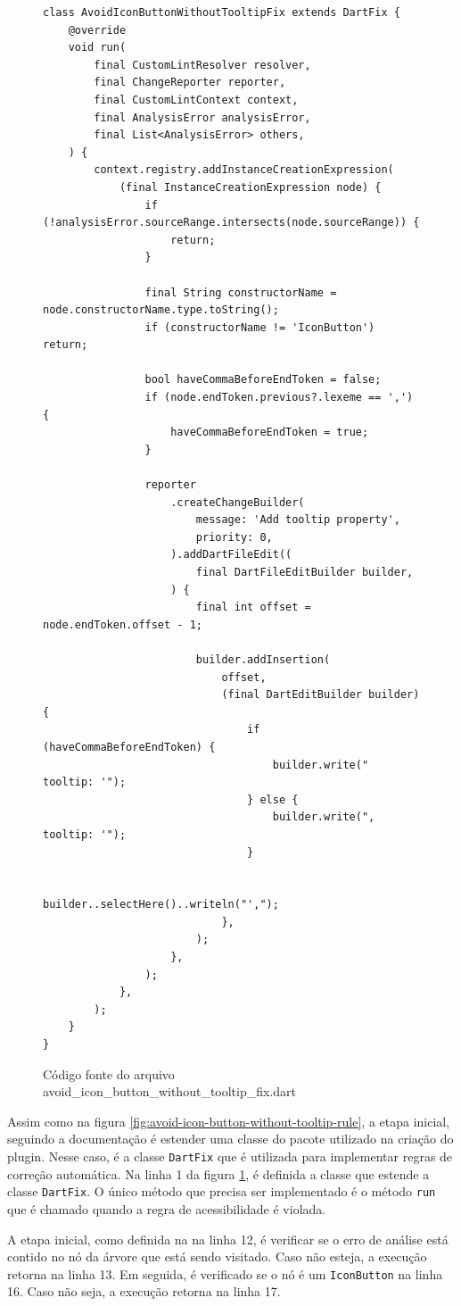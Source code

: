 \begin{figure}[!htbp]
\centering
\caption{Código fonte do arquivo avoid\_icon\_button\_without\_tooltip\_fix.dart}\label{fig:avoid-icon-button-without-tooltip-rule-fix}
\begin{lstlisting}
class AvoidIconButtonWithoutTooltipFix extends DartFix {
	@override
	void run(
		final CustomLintResolver resolver,
		final ChangeReporter reporter,
		final CustomLintContext context,
		final AnalysisError analysisError,
		final List<AnalysisError> others,
	) {
		context.registry.addInstanceCreationExpression(
			(final InstanceCreationExpression node) {
				if (!analysisError.sourceRange.intersects(node.sourceRange)) {
					return;
				}

				final String constructorName = node.constructorName.type.toString();
				if (constructorName != 'IconButton') return;

				bool haveCommaBeforeEndToken = false;
				if (node.endToken.previous?.lexeme == ',') {
					haveCommaBeforeEndToken = true;
				}

				reporter
					.createChangeBuilder(
						message: 'Add tooltip property',
						priority: 0,
					).addDartFileEdit((
						final DartFileEditBuilder builder,
					) {
						final int offset = node.endToken.offset - 1;

						builder.addInsertion(
							offset,
							(final DartEditBuilder builder) {
								if (haveCommaBeforeEndToken) {
									builder.write(" tooltip: '");
								} else {
									builder.write(", tooltip: '");
								}

								builder..selectHere()..writeln("',");
							},
						);
					},
				);
			},
		);
	}
}
\end{lstlisting}
\vspace{2mm}
\end{figure}

Assim como na figura \ref{fig:avoid-icon-button-without-tooltip-rule}, a etapa inicial, seguindo a documentação \cite{customlintbuilder} é estender uma classe do pacote utilizado na criação do plugin. Nesse caso, é a classe \texttt{DartFix} que é utilizada para implementar regras de correção automática. Na linha 1 da figura \ref{fig:avoid-icon-button-without-tooltip-rule-fix}, é definida a classe  que estende a classe \texttt{DartFix}. O único método que precisa ser implementado é o método \texttt{run} que é chamado quando a regra de acessibilidade é violada.

A etapa inicial, como definida na na linha 12, é verificar se o erro de análise está contido no nó da árvore que está sendo visitado. Caso não esteja, a execução retorna na linha 13. Em seguida, é verificado se o nó é um \texttt{IconButton} na linha 16. Caso não seja, a execução retorna na linha 17.

